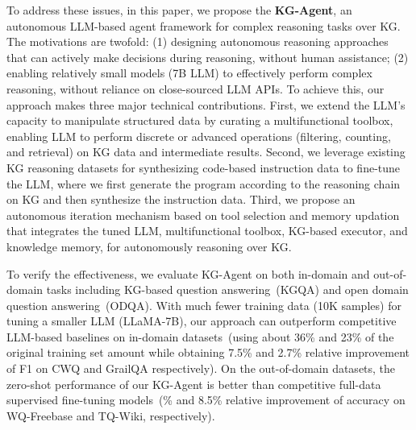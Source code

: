 To address these issues, in this paper, we propose the \textbf{KG-Agent}, an autonomous LLM-based agent framework for complex reasoning tasks over KG. 
The motivations are twofold: (1) designing autonomous reasoning approaches that can actively make decisions during reasoning, without human assistance; (2) enabling relatively small models (\eg 7B LLM) to effectively perform complex reasoning,  without reliance on close-sourced LLM APIs. 
To achieve this, our approach makes three major technical contributions. First, we extend the LLM's capacity to manipulate structured data by curating a multifunctional toolbox, enabling LLM to perform discrete or advanced operations (\eg filtering, counting, and retrieval) on KG data and intermediate results. Second, we leverage existing KG reasoning datasets for synthesizing code-based instruction data to fine-tune the LLM, where we first generate the program according to the reasoning chain on KG and then synthesize the instruction data. 
Third, we propose an autonomous iteration mechanism based on tool selection and memory updation that integrates the tuned LLM, multifunctional toolbox, KG-based executor, and knowledge memory, for autonomously reasoning over KG.
 
To verify the effectiveness, we evaluate  KG-Agent on both in-domain and out-of-domain tasks including KG-based question answering~(KGQA) and open domain question answering~(ODQA).
With much fewer training data (\ie 10K samples) for tuning a smaller LLM (\ie LLaMA-7B), our approach can outperform competitive LLM-based baselines on in-domain datasets~(\eg using about 36\% and 23\% of the original training set amount while obtaining 7.5\% and 2.7\% relative improvement of F1 on CWQ and GrailQA respectively).
On the out-of-domain datasets, the zero-shot performance of our KG-Agent is better than competitive full-data supervised fine-tuning models~(\% and 8.5\% relative improvement of accuracy on WQ-Freebase and TQ-Wiki, respectively).

